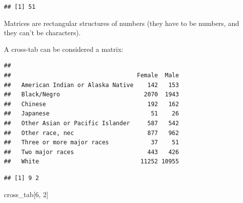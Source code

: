 \documentclass[
]{book}
\newenvironment{Shaded}{\begin{snugshade}}{\end{snugshade}}
\newcommand{\DecValTok}[1]{\textcolor[rgb]{0.00,0.00,0.81}{#1}}
\newcommand{\KeywordTok}[1]{\textcolor[rgb]{0.13,0.29,0.53}{\textbf{#1}}}
\newcommand{\NormalTok}[1]{#1}
\newcommand{\OperatorTok}[1]{\textcolor[rgb]{0.81,0.36,0.00}{\textbf{#1}}}
\newcommand{\StringTok}[1]{\textcolor[rgb]{0.31,0.60,0.02}{#1}}
\theoremstyle{definition}
\theoremstyle{definition}
\theoremstyle{definition}
\theoremstyle{definition}
\theoremstyle{remark}
\begin{document}
\begin{Shaded}
\end{Shaded}

\begin{verbatim}
## [1] 51
\end{verbatim}

Matrices are rectangular structures of numbers (they have to be numbers, and they can't be characters).

A cross-tab can be considered a matrix:

\begin{Shaded}
\end{Shaded}

\begin{verbatim}
##                                   
##                                    Female  Male
##   American Indian or Alaska Native    142   153
##   Black/Negro                        2070  1943
##   Chinese                             192   162
##   Japanese                             51    26
##   Other Asian or Pacific Islander     587   542
##   Other race, nec                     877   962
##   Three or more major races            37    51
##   Two major races                     443   426
##   White                             11252 10955
\end{verbatim}

\begin{Shaded}
\end{Shaded}

\begin{verbatim}
## [1] 9 2
\end{verbatim}

\begin{Shaded}
\begin{Highlighting}[]
\NormalTok{cross_tab[}\DecValTok{6}\NormalTok{, }\DecValTok{2}\NormalTok{]}
\end{Highlighting}
\end{Shaded}
\end{document}
